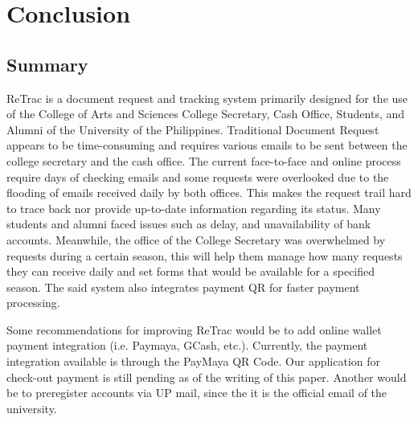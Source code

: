 \chapter{Conclusion}
\section{Summary}
ReTrac is a document request and tracking system primarily designed for the use of the College of Arts and Sciences College Secretary, Cash Office, Students, and Alumni of the University of the Philippines. Traditional Document Request appears to be time-consuming and requires various emails to be sent between the college secretary and the cash office. The current face-to-face and online process require days of checking emails and some requests were overlooked due to the flooding of emails received daily by both offices. This makes the request trail hard to trace back nor provide up-to-date information regarding its status. Many students and alumni faced issues such as delay, and unavailability of bank accounts. Meanwhile, the office of the College Secretary was overwhelmed by requests during a certain season, this will help them manage how many requests they can receive daily and set forms that would be available for a specified season. The said system also integrates payment QR for faster payment processing. 

Some recommendations for improving ReTrac would be to add online wallet payment integration (i.e. Paymaya, GCash, etc.). Currently, the payment integration available is through the PayMaya QR Code. Our application for check-out payment is still pending as of the writing of this paper. Another would be to preregister accounts via UP mail, since the it is the official email of the university.


